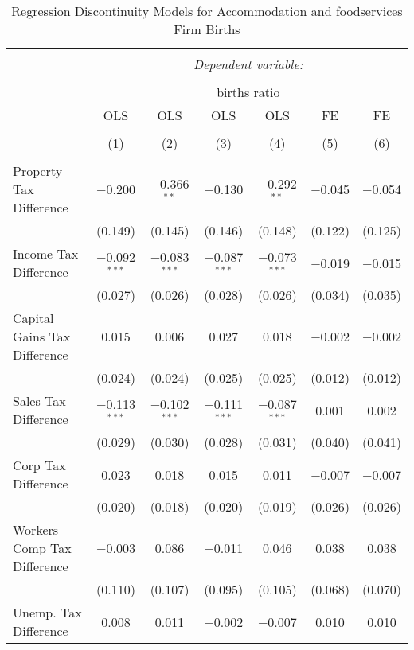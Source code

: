 
\begin{table}[!htbp] \centering 
  \caption{Regression Discontinuity Models for  Accommodation and foodservices Firm Births} 
  \label{72rd} 
\footnotesize 
\begin{tabular}{@{\extracolsep{5pt}}lcccccc} 
\\[-1.8ex]\hline 
\hline \\[-1.8ex] 
 & \multicolumn{6}{c}{\textit{Dependent variable:}} \\ 
\cline{2-7} 
\\[-1.8ex] & \multicolumn{6}{c}{births ratio} \\ 
 & OLS & OLS & OLS & OLS & FE & FE \\ 
\\[-1.8ex] & (1) & (2) & (3) & (4) & (5) & (6)\\ 
\hline \\[-1.8ex] 
 Property Tax Difference & $-$0.200 & $-$0.366$^{**}$ & $-$0.130 & $-$0.292$^{**}$ & $-$0.045 & $-$0.054 \\ 
  & (0.149) & (0.145) & (0.146) & (0.148) & (0.122) & (0.125) \\ 
  Income Tax Difference & $-$0.092$^{***}$ & $-$0.083$^{***}$ & $-$0.087$^{***}$ & $-$0.073$^{***}$ & $-$0.019 & $-$0.015 \\ 
  & (0.027) & (0.026) & (0.028) & (0.026) & (0.034) & (0.035) \\ 
  Capital Gains Tax Difference & 0.015 & 0.006 & 0.027 & 0.018 & $-$0.002 & $-$0.002 \\ 
  & (0.024) & (0.024) & (0.025) & (0.025) & (0.012) & (0.012) \\ 
  Sales Tax Difference & $-$0.113$^{***}$ & $-$0.102$^{***}$ & $-$0.111$^{***}$ & $-$0.087$^{***}$ & 0.001 & 0.002 \\ 
  & (0.029) & (0.030) & (0.028) & (0.031) & (0.040) & (0.041) \\ 
  Corp Tax Difference & 0.023 & 0.018 & 0.015 & 0.011 & $-$0.007 & $-$0.007 \\ 
  & (0.020) & (0.018) & (0.020) & (0.019) & (0.026) & (0.026) \\ 
  Workers Comp Tax Difference & $-$0.003 & 0.086 & $-$0.011 & 0.046 & 0.038 & 0.038 \\ 
  & (0.110) & (0.107) & (0.095) & (0.105) & (0.068) & (0.070) \\ 
  Unemp. Tax Difference & 0.008 & 0.011 & $-$0.002 & $-$0.007 & 0.010 & 0.010 \\ 

\end{tabular}
\end{table}
